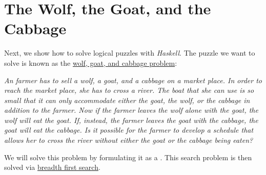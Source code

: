  
\section{The Wolf, the Goat, and the Cabbage}
Next,  we show how to solve logical puzzles with \textsl{Haskell}.  The puzzle we
want to solve is known as the  
\href{https://en.wikipedia.org/wiki/Wolf,_goat_and_cabbage_problem}{wolf, goat, and cabbage problem}:  
\vspace*{0.3cm}

\begin{minipage}[c]{15cm}
{\sl
An farmer has to sell a wolf, a goat, and a cabbage on a market place.  In order to
reach the market place, she has to cross a river.  The boat that she can use is so small that it can
only accommodate either the goat, the wolf, or the cabbage in addition to the farmer.
Now if the farmer leaves the wolf alone with the goat, the wolf will eat the goat.
If, instead, the farmer leaves the goat with the cabbage, the goat will eat the cabbage.
Is it possible for the farmer to develop a schedule that allows her to cross the river
without either the goat or the cabbage being eaten?
}
\end{minipage}
\vspace*{0.3cm}

\noindent
We will solve this problem by formulating it as a .  This search problem is then solved
via \href{https://en.wikipedia.org/wiki/Breadth-first_search}{breadth first search}.

